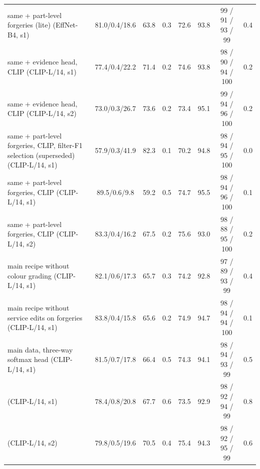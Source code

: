 \begin{tabular}{l c cc c c c c}
same + part-level forgeries (lite) (EffNet-B4, s1) & 81.0/0.4/18.6 & 63.8 & 0.3 & 72.6 & 93.8 & 99 / 91 / 93 / 99 & 0.4 \\
same + evidence head, CLIP (CLIP-L/14, s1) & 77.4/0.4/22.2 & 71.4 & 0.2 & 74.6 & 93.8 & 98 / 90 / 94 / 100 & 0.2 \\
same + evidence head, CLIP (CLIP-L/14, s2) & 73.0/0.3/26.7 & 73.6 & 0.2 & 73.4 & 95.1 & 99 / 94 / 96 / 100 & 0.2 \\
same + part-level forgeries, CLIP, filter-F1 selection (superseded) (CLIP-L/14, s1) & 57.9/0.3/41.9 & 82.3 & 0.1 & 70.2 & 94.8 & 98 / 94 / 95 / 100 & 0.0 \\
same + part-level forgeries, CLIP (CLIP-L/14, s1) & 89.5/0.6/9.8 & 59.2 & 0.5 & 74.7 & 95.5 & 98 / 94 / 96 / 100 & 0.1 \\
same + part-level forgeries, CLIP (CLIP-L/14, s2) & 83.3/0.4/16.2 & 67.5 & 0.2 & 75.6 & 93.0 & 98 / 88 / 95 / 100 & 0.2 \\
main recipe without colour grading (CLIP-L/14, s1) & 82.1/0.6/17.3 & 65.7 & 0.3 & 74.2 & 92.8 & 97 / 89 / 93 / 99 & 0.4 \\
main recipe without service edits on forgeries (CLIP-L/14, s1) & 83.8/0.4/15.8 & 65.6 & 0.2 & 74.9 & 94.7 & 98 / 94 / 94 / 100 & 0.1 \\
main data, three-way softmax head (CLIP-L/14, s1) & 81.5/0.7/17.8 & 66.4 & 0.5 & 74.3 & 94.1 & 98 / 94 / 93 / 99 & 0.5 \\
\oursF{} (CLIP-L/14, s1) & 78.4/0.8/20.8 & 67.7 & 0.6 & 73.5 & 92.9 & 98 / 92 / 94 / 99 & 0.8 \\
\oursF{} (CLIP-L/14, s2) & 79.8/0.5/19.6 & 70.5 & 0.4 & 75.4 & 94.3 & 98 / 92 / 95 / 99 & 0.6 \\
\bottomrule
\end{tabular}
